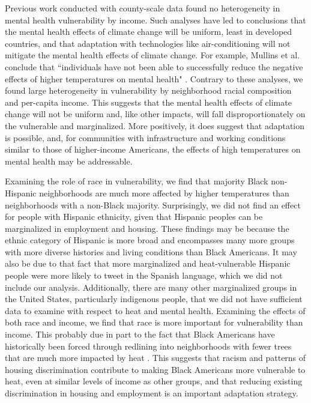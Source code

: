 \documentclass[titlepage]{article}
\begin{document}
Previous work conducted with county-scale data found no heterogeneity in mental health vulnerability by income. Such analyses have led to conclusions that the mental health effects of climate change will be uniform, least in developed countries, and that adaptation with technologies like air-conditioning will not mitigate the mental health effects of climate change. For example, Mullins et al. conclude that ``individuals have not been able to successfully reduce the negative effects of higher temperatures on mental health" \citep{Mullins2019Dec}. Contrary to these analyses, we found large heterogeneity in vulnerability by neighborhood racial composition and per-capita income. This suggests that the mental health effects of climate change will not be uniform and, like other impacts, will fall disproportionately on the vulnerable and marginalized. More positively, it does suggest that adaptation is possible, and, for communities with infrastructure and working conditions similar to those of higher-income Americans, the effects of high temperatures on mental health may be addressable.

Examining the role of race in vulnerability, we find that majority Black non-Hispanic neighborhoods are much more affected by higher temperatures than neighborhoods with a non-Black majority. Surprisingly, we did not find an effect for people with Hispanic ethnicity, given that Hispanic peoples can be marginalized in employment and housing. These findings may be because the ethnic category of Hispanic is more broad and encompasses many more groups with more diverse histories and living conditions than Black Americans. It may also be due to that fact that more marginalized and heat-vulnerable Hispanic people were more likely to tweet in the Spanish language, which we did not include our analysis. Additionally, there are many other marginalized groups in the United States, particularly indigenous people, that we did not have sufficient data to examine with respect to heat and mental health. Examining the effects of both race and income, we find that race is more important for vulnerability than income. This probably due in part to the fact that Black Americans have historically been forced through redlining into neighborhoods with fewer trees that are much more impacted by heat \citep{Hoffman2020, Locke2021}.  This suggests that racism and patterns of housing discrimination contribute to making Black Americans more vulnerable to heat, even at similar levels of income as other groups, and that reducing existing discrimination in housing and employment is an important adaptation strategy.
\end{document}
